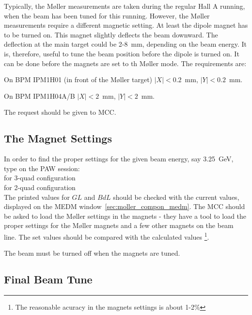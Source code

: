 { Typically, the M{\o}ller measurements are taken during the regular Hall A
 running, when the beam has been tuned for this running. However,
 the M{\o}ller measurements require a different magnetic setting.
 At least the dipole magnet has to be turned on. This magnet
 slightly deflects the beam downward. The deflection at the main target
 could be 2-8~mm, depending on the beam energy. It is, therefore, 
 useful to tune the beam position before the dipole is turned on. It can be done
 before the magnets are set to th M{\o}ller mode.
 The requirements are: 
 \begin{list}{--}{\setlength{\itemsep}{-0.15cm}}
   \item On BPM IPM1H01 (in front of the M{\o}ller target) $|X|<0.2$~mm, $|Y|<0.2$~mm.
   \item On BPM IPM1H04A/B $|X|<2$~mm, $|Y|<2$~mm.
 \end{list}
 The request should be given to MCC. 

\subsection {The Magnet Settings}
\label{sec:moller_oper_magset}

 In order to find the proper settings for the given beam energy, say 3.25~GeV, 
 type on the PAW session: \\ 
 \hspace*{0.5cm}  for 3-quad configuration \\
 \hspace*{0.5cm}  for 2-quad configuration \\
 The printed values for $GL$ and $BdL$ should be checked with the current values,
 displayed on the MEDM window~\ref{sec:moller_compon_medm}. 
 The MCC should be asked to load the M{\o}ller settings in the magnets -
 they have a tool to load the proper settings for the M{\o}ller
 magnets and a few other magnets on the beam line. 
 The set values should be compared with the calculated values%
 \footnote{The reasonable acuracy in the  magnets settings is about 1-2\%}.
 \begin{safetyen}{5}{2}
   The beam must be turned off when the magnets are tuned.
 \end{safetyen}


\subsection {Final Beam Tune}
\label{sec:moller_oper_finalbeam}

}
